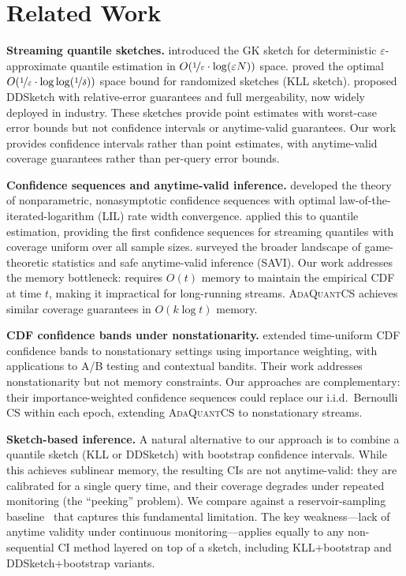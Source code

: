 \documentclass{article}
\newcommand{\ours}{\textsc{AdaQuantCS}}
\begin{document}
\section{Related Work}
\label{sec:related}

\textbf{Streaming quantile sketches.} \citet{greenwald2001space} introduced the GK sketch for deterministic $\varepsilon$-approximate quantile estimation in $O(\nicefrac{1}{\varepsilon} \cdot \log(\varepsilon N))$ space. \citet{karnin2016optimal} proved the optimal $O(\nicefrac{1}{\varepsilon} \cdot \log\log(\nicefrac{1}{\delta}))$ space bound for randomized sketches (KLL sketch). \citet{masson2019ddsketch} proposed DDSketch with relative-error guarantees and full mergeability, now widely deployed in industry. These sketches provide point estimates with worst-case error bounds but not confidence intervals or anytime-valid guarantees. Our work provides confidence intervals rather than point estimates, with anytime-valid coverage guarantees rather than per-query error bounds.

\textbf{Confidence sequences and anytime-valid inference.} \citet{howard2021time} developed the theory of nonparametric, nonasymptotic confidence sequences with optimal law-of-the-iterated-logarithm (LIL) rate width convergence. \citet{howard2022sequential} applied this to quantile estimation, providing the first confidence sequences for streaming quantiles with coverage uniform over all sample sizes. \citet{ramdas2023game} surveyed the broader landscape of game-theoretic statistics and safe anytime-valid inference (SAVI). Our work addresses the memory bottleneck: \citet{howard2022sequential} requires $O(t)$ memory to maintain the empirical CDF at time $t$, making it impractical for long-running streams. \ours{} achieves similar coverage guarantees in $O(k \log t)$ memory.

\textbf{CDF confidence bands under nonstationarity.} \citet{mineiro2023time} extended time-uniform CDF confidence bands to nonstationary settings using importance weighting, with applications to A/B testing and contextual bandits. Their work addresses nonstationarity but not memory constraints. Our approaches are complementary: their importance-weighted confidence sequences could replace our i.i.d.\ Bernoulli CS within each epoch, extending \ours{} to nonstationary streams.

\textbf{Sketch-based inference.} A natural alternative to our approach is to combine a quantile sketch (KLL or DDSketch) with bootstrap confidence intervals. While this achieves sublinear memory, the resulting CIs are not anytime-valid: they are calibrated for a single query time, and their coverage degrades under repeated monitoring (the ``peeking'' problem). We compare against a reservoir-sampling baseline~\citep{vitter1985random} that captures this fundamental limitation. The key weakness---lack of anytime validity under continuous monitoring---applies equally to any non-sequential CI method layered on top of a sketch, including KLL+bootstrap and DDSketch+bootstrap variants.
\end{document}
